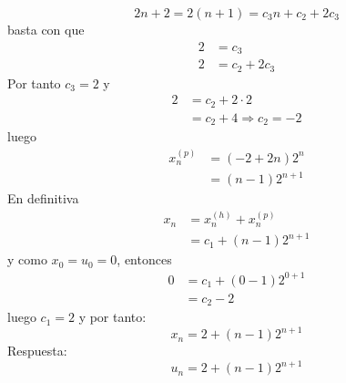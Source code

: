 \begin{ejercicio}
\begin{enumerate}
\begin{equation*}
                2n+2 = 2(n+1) = c_3n + c_2 + 2c_3
            \end{equation*}
            basta con que 
            \begin{align*}
                2 &= c_3 \\
                2 &= c_2 + 2c_3 
            \end{align*}
            Por tanto $c_3 = 2$ y 
            \begin{align*}
                2 &= c_2 + 2 \cdot 2 \\
                  &= c_2 + 4 \Longrightarrow c_2 = -2
            \end{align*}
            luego 
            \begin{align*}
                x_n^{(p)} &= (-2+2n)2^n \\
                          &= (n-1)2^{n+1}
            \end{align*}
            En definitiva
            \begin{align*}
                x_n &= x_n^{(h)} + x_n^{(p)} \\
                    &= c_1 + (n-1) 2^{n+1}
            \end{align*}
            y como $x_0 = u_0 = 0$, entonces
            \begin{align*}
                0 &= c_1 + (0-1)2^{0+1} \\
                  &= c_2 - 2
            \end{align*}
            luego $c_1 = 2$ y por tanto: 
            \begin{equation*}
                x_n = 2 +(n-1)2^{n+1}
            \end{equation*}
            Respuesta:
            \begin{equation*}
                u_n = 2 + (n-1)2^{n+1}
            \end{equation*}
    \end{enumerate} 
\end{ejercicio}

